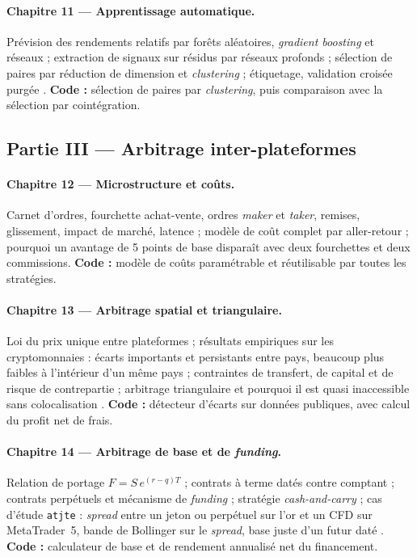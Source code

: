 \documentclass[11pt,a4paper]{article}
\begin{document}
\paragraph{Chapitre 11 — Apprentissage automatique.}
Prévision des rendements relatifs par forêts aléatoires, \emph{gradient boosting} et réseaux \citep{krauss2017ml} ; extraction de signaux sur résidus par réseaux profonds \citep{guijarro2021} ; sélection de paires par réduction de dimension et \emph{clustering} \citep{sarmento2020} ; étiquetage, validation croisée purgée \citep{lopezdeprado2018}. \textbf{Code :} sélection de paires par \emph{clustering}, puis comparaison avec la sélection par cointégration.

\subsection{Partie III — Arbitrage inter-plateformes}

\paragraph{Chapitre 12 — Microstructure et coûts.}
Carnet d'ordres, fourchette achat-vente, ordres \emph{maker} et \emph{taker}, remises, glissement, impact de marché, latence \citep{harris2003} ; modèle de coût complet par aller-retour ; pourquoi un avantage de 5 points de base disparaît avec deux fourchettes et deux commissions. \textbf{Code :} modèle de coûts paramétrable et réutilisable par toutes les stratégies.

\paragraph{Chapitre 13 — Arbitrage spatial et triangulaire.}
Loi du prix unique entre plateformes ; résultats empiriques sur les cryptomonnaies \citep{makarov2020} : écarts importants et persistants entre pays, beaucoup plus faibles à l'intérieur d'un même pays ; contraintes de transfert, de capital et de risque de contrepartie ; arbitrage triangulaire et pourquoi il est quasi inaccessible sans colocalisation \citep{budish2015}. \textbf{Code :} détecteur d'écarts sur données publiques, avec calcul du profit net de frais.

\paragraph{Chapitre 14 — Arbitrage de base et de \emph{funding}.}
Relation de portage $F = S\,e^{(r-q)T}$ \citep{hull2022} ; contrats à terme datés contre comptant ; contrats perpétuels et mécanisme de \emph{funding} ; stratégie \emph{cash-and-carry} ; cas d'étude \texttt{atjte} : \emph{spread} entre un jeton ou perpétuel sur l'or et un CFD sur MetaTrader~5, bande de Bollinger sur le \emph{spread}, base \og juste\fg{} d'un futur daté \citep{atjte}. \textbf{Code :} calculateur de base et de rendement annualisé net du financement.
\end{document}
